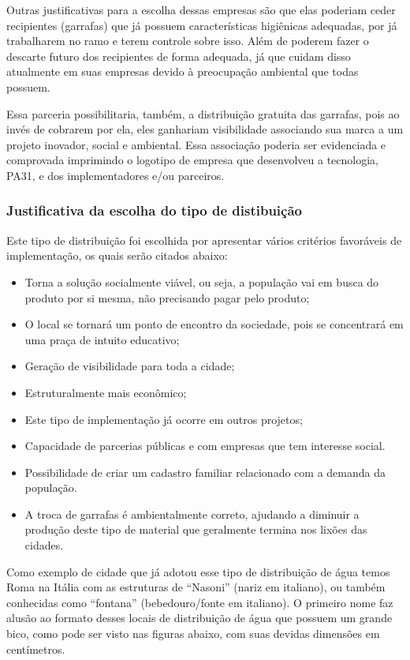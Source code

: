     Outras justificativas para a escolha dessas empresas são que elas poderiam ceder recipientes (garrafas) que já possuem características higiênicas adequadas, por já trabalharem no ramo e terem controle sobre isso. Além de poderem fazer o descarte futuro dos recipientes de forma adequada, já que cuidam disso atualmente em suas empresas devido à preocupação ambiental que todas possuem.
    
    Essa parceria possibilitaria, também, a distribuição gratuita das garrafas, pois ao invés de cobrarem por ela, eles ganhariam visibilidade associando sua marca a um projeto inovador, social e ambiental. Essa associação poderia ser evidenciada e comprovada imprimindo o logotipo de empresa que desenvolveu a tecnologia, PA31, e dos implementadores e/ou parceiros.
    
    \subsubsection{Justificativa da escolha do tipo de distibuição}
    
      Este tipo de distribuição foi escolhida por apresentar vários critérios favoráveis de implementação, os quais serão citados abaixo:
      
      \begin{itemize}
       \item Torna a solução socialmente viável, ou seja, a população vai em busca do produto por si mesma, não precisando pagar pelo produto;
       \item O local se tornará um ponto de encontro da sociedade, pois se concentrará em uma praça de intuito educativo;
       \item Geração de visibilidade para toda a cidade;
       \item Estruturalmente mais econômico;
       \item Este tipo de implementação já ocorre em outros projetos;
       \item Capacidade de parcerias públicas e com empresas que tem interesse social.
       \item Possibilidade de criar um cadastro familiar relacionado com a demanda da população.
       \item A troca de garrafas é ambientalmente correto, ajudando a diminuir a produção deste tipo de material que geralmente termina nos lixões das cidades.
      \end{itemize}

	Como exemplo de cidade que já adotou esse tipo de distribuição de água temos Roma na Itália com as estruturas de “Nasoni” (nariz em italiano), ou também conhecidas como “fontana” (bebedouro/fonte em italiano). O primeiro nome faz alusão ao formato desses locais de distribuição de água que possuem um grande bico, como pode ser visto nas figuras abaixo, com suas devidas dimensões em centímetros\cite{rodrigues}. 
	
